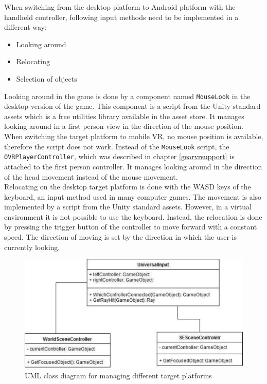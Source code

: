 When switching from the desktop platform to Android platform with the handheld controller, following input methods need to be implemented in a different way:
\begin{itemize}
\item Looking around
\item Relocating
\item Selection of objects
\end{itemize}
Looking around in the game is done by a component named \texttt{MouseLook} in the desktop version of the game. This component is a script from the Unity standard assets which is a free utilities library available in the asset store. It manages looking around in a first person view in the direction of the mouse position. When switching the target platform to mobile VR, no mouse position is available, therefore the script does not work. Instead of the \texttt{MouseLook} script, the \texttt{OVRPlayerController}, which was described in chapter \ref{gearvrsupport} is attached to the first person controller. It manages looking around in the direction of the head movement instead of the mouse movement.\\
Relocating on the desktop target platform is done with the WASD keys of the keyboard, an input method used in many computer games. The movement is also implemented by a script from the Unity standard assets. However, in a virtual environment it is not possible to use the keyboard. Instead, the relocation is done by pressing the trigger button of the controller to move forward with a constant speed. The direction of moving is set by the direction in which the user is currently looking.\\
\begin{figure}[h!]
  \includegraphics[width=13cm]{kapitel/eps/uml-input.pdf}
  \centering
  \caption{UML class diagram for managing different target platforms}
  \label{fig:uml-universalinput}
\end{figure}
